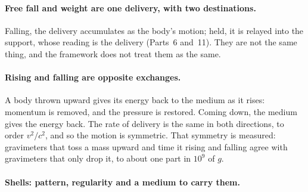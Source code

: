 \documentclass[11pt,a4paper]{article}
\begin{document}
\paragraph{Free fall and weight are one delivery, with two destinations.} Falling, the delivery accumulates as the body's motion; held, it is relayed into the support, whose reading is the delivery (Parts~6 and~11). They are not the same thing, and the framework does not treat them as the same.

\paragraph{Rising and falling are opposite exchanges.} A body thrown upward gives its energy back to the medium as it rises: momentum is removed, and the pressure is restored. Coming down, the medium gives the energy back. The rate of delivery is the same in both directions, to order $v^2/c^2$, and so the motion is symmetric. That symmetry is measured: gravimeters that toss a mass upward and time it rising and falling agree with gravimeters that only drop it, to about one part in $10^9$ of $g$. 

\paragraph{Shells: pattern, regularity and a medium to carry them.} 
\end{document}
